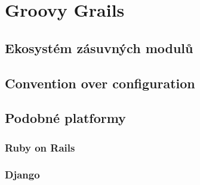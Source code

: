\chapter{Groovy Grails}
\blindtext

\section{Ekosystém zásuvných modulů}
\blindtext[1]

\section{Convention over configuration}
\blindtext[1]

\section{Podobné platformy}
\blindtext[1]

\subsection{Ruby on Rails}
\blindtext

\subsection{Django}
\blindtext
